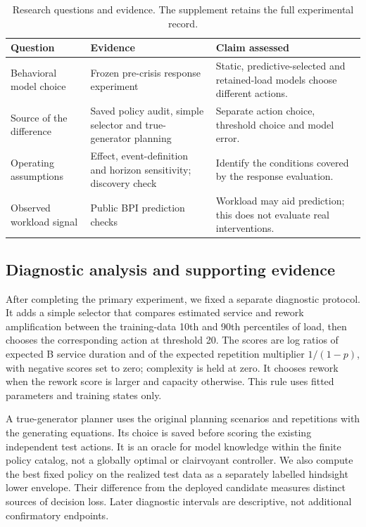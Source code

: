 \begin{table}[t]
\caption{Research questions and evidence. The supplement retains the full experimental record.}\label{tab:questions}
\centering\small\setlength{\tabcolsep}{3pt}\begin{tabular}{p{}p{}p{}}\toprule
Question & Evidence & Claim assessed\\\midrule
Behavioral model choice & Frozen pre-crisis response experiment & Static, predictive-selected and retained-load models choose different actions.\\
Source of the difference & Saved policy audit, simple selector and true-generator planning & Separate action choice, threshold choice and model error.\\
Operating assumptions & Effect, event-definition and horizon sensitivity; discovery check & Identify the conditions covered by the response evaluation.\\
Observed workload signal & Public BPI prediction checks & Workload may aid prediction; this does not evaluate real interventions.\\\bottomrule
\end{tabular}\end{table}

\subsection{Diagnostic analysis and supporting evidence}
After completing the primary experiment, we fixed a separate diagnostic protocol. It adds a simple selector that compares estimated service and rework amplification between the training-data 10th and 90th percentiles of load, then chooses the corresponding action at threshold 20. The scores are log ratios of expected B service duration and of the expected repetition multiplier $1/(1-p)$, with negative scores set to zero; complexity is held at zero. It chooses rework when the rework score is larger and capacity otherwise. This rule uses fitted parameters and training states only.

A true-generator planner uses the original planning scenarios and repetitions with the generating equations. Its choice is saved before scoring the existing independent test actions. It is an oracle for model knowledge within the finite policy catalog, not a globally optimal or clairvoyant controller. We also compute the best fixed policy on the realized test data as a separately labelled hindsight lower envelope. Their difference from the deployed candidate measures distinct sources of decision loss. Later diagnostic intervals are descriptive, not additional confirmatory endpoints.

